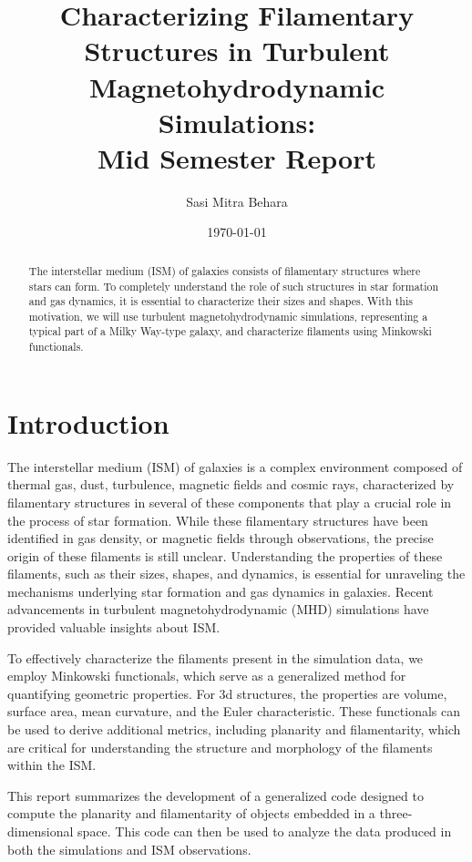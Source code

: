 \documentclass{article}
\title{Characterizing Filamentary Structures in Turbulent Magnetohydrodynamic Simulations: \\
{Mid Semester Report}}
\author{Sasi Mitra Behara}
\date{\today}
\begin{document}
\maketitle

\begin{abstract}
The interstellar medium (ISM) of galaxies consists of filamentary structures where stars can form. To completely understand the role of such structures in star formation and gas dynamics, it is essential to characterize their sizes and shapes. With this motivation, we will use turbulent magnetohydrodynamic simulations, representing a typical part of a Milky Way-type galaxy, and characterize filaments using Minkowski functionals.
\end{abstract}


\section{Introduction}

The interstellar medium (ISM) of galaxies is a complex environment composed of thermal gas, dust, turbulence, magnetic fields and cosmic rays, characterized by filamentary structures in several of these components that play a crucial role in the process of star formation. While these filamentary structures have been identified in gas density, or magnetic fields through observations, the precise origin of these filaments is still unclear. Understanding the properties of these filaments, such as their sizes, shapes, and dynamics, is essential for unraveling the mechanisms underlying star formation and gas dynamics in galaxies. Recent advancements in turbulent magnetohydrodynamic (MHD) simulations have provided valuable insights about ISM.

To effectively characterize the filaments present in the simulation data, we employ Minkowski functionals, which serve as a generalized method for quantifying geometric properties. For 3d structures, the properties are volume, surface area, mean curvature, and the Euler characteristic. These functionals can be used to derive additional metrics, including planarity and filamentarity, which are critical for understanding the structure and morphology of the filaments within the ISM.

This report summarizes the development of a generalized code designed to compute the planarity and filamentarity of objects embedded in a three-dimensional space. This code can then be used to analyze the data produced in both the simulations and ISM observations.
\end{document}
